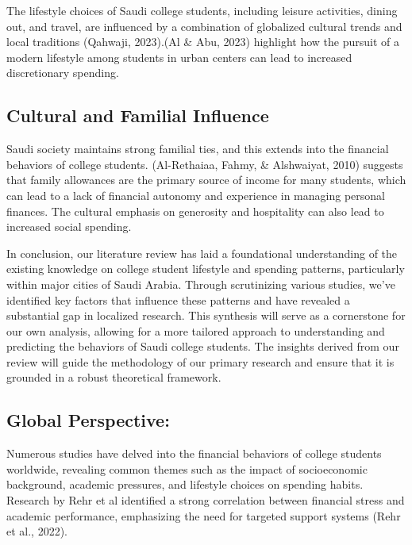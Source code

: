 \documentclass[
]{article}
\begin{document}
The lifestyle choices of Saudi college students, including leisure
activities, dining out, and travel, are influenced by a combination of
globalized cultural trends and local traditions (Qahwaji, 2023).(Al \&
Abu, 2023) highlight how the pursuit of a modern lifestyle among
students in urban centers can lead to increased discretionary spending.

\hypertarget{cultural-and-familial-influence}{%
\subsection{Cultural and Familial
Influence}\label{cultural-and-familial-influence}}

Saudi society maintains strong familial ties, and this extends into the
financial behaviors of college students. (Al-Rethaiaa, Fahmy, \&
Alshwaiyat, 2010) suggests that family allowances are the primary source
of income for many students, which can lead to a lack of financial
autonomy and experience in managing personal finances. The cultural
emphasis on generosity and hospitality can also lead to increased social
spending.

In conclusion, our literature review has laid a foundational
understanding of the existing knowledge on college student lifestyle and
spending patterns, particularly within major cities of Saudi Arabia.
Through scrutinizing various studies, we've identified key factors that
influence these patterns and have revealed a substantial gap in
localized research. This synthesis will serve as a cornerstone for our
own analysis, allowing for a more tailored approach to understanding and
predicting the behaviors of Saudi college students. The insights derived
from our review will guide the methodology of our primary research and
ensure that it is grounded in a robust theoretical framework.

\hypertarget{global-perspective}{%
\subsection{Global Perspective:}\label{global-perspective}}

Numerous studies have delved into the financial behaviors of college
students worldwide, revealing common themes such as the impact of
socioeconomic background, academic pressures, and lifestyle choices on
spending habits. Research by Rehr et al identified a strong correlation
between financial stress and academic performance, emphasizing the need
for targeted support systems (Rehr et al., 2022).
\end{document}
